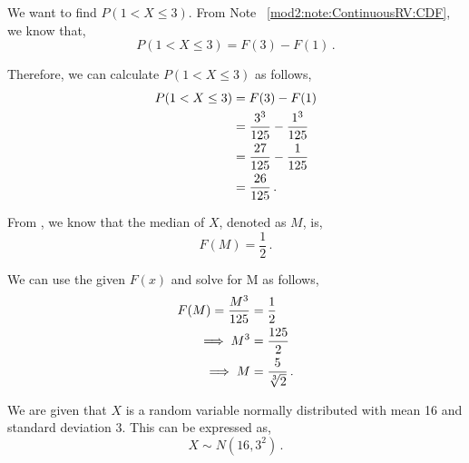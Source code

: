\begin{subquestions}
\begin{subsubquestions}
\subsubquestion

We want to find $P(1 < X \leq 3)$. From Note ~\ref{mod2:note:ContinuousRV:CDF}, we know that,
\begin{equation}
	P( 1 < X \leq 3) = F(3) - F(1) \,.
\end{equation}

Therefore, we can calculate $P(1 < X \leq 3)$ as follows,
\begin{align}
	P( 1 < X \leq 3) & = F(3) - F(1) \nonumber \\
	                 & = \frac{3^3}{125} - \frac{1^3}{125} \nonumber \\
	                 & = \frac{27}{125} - \frac{1}{125} \nonumber \\
	                 & = \frac{26}{125} \,.
\end{align}


\subsubquestion

From , we know that the median of $X$, denoted as $M$, is,
\begin{equation}
	F(M) = \frac{1}{2} \,.
\end{equation}

We can use the given $F(x)$ and solve for M as follows,
\begin{align}
	F(M) = \frac{M^3}{125} & = \frac{1}{2} \nonumber \\
	        \implies M^3 & = \frac{125}{2} \nonumber \\
	        \implies M & = \frac{5}{\sqrt[3]{2}} \,.
\end{align}

\end{subsubquestions}
	
	
\subquestion

We are given that $X$ is a random variable normally distributed with mean 16 and standard deviation 3. This can be expressed as,
\begin{equation}
	X \sim N(16, 3^2) \,.
\end{equation}

\begin{subsubquestions}
	
\subsubquestion


\end{subsubquestions}
\end{subquestions}
